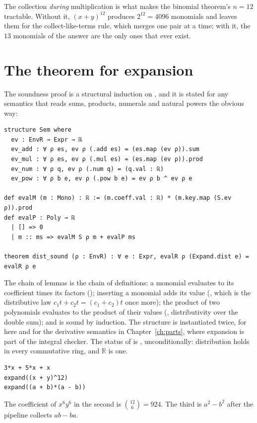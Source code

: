 The collection \emph{during} multiplication is what makes the binomial theorem's $n = 12$
tractable. Without it, $(x+y)^{12}$ produces $2^{12} = 4096$ monomials and leaves them for the
collect-like-terms rule, which merges one pair at a time; with it, the $13$ monomials of the
answer are the only ones that ever exist.

\section{The theorem for expansion}

The soundness proof is a structural induction on , and it is stated for any semantics
that reads sums, products, numerals and natural powers the obvious way:

\begin{verbatim}
structure Sem where
  ev : EnvR → Expr → ℝ
  ev_add : ∀ ρ es, ev ρ (.add es) = (es.map (ev ρ)).sum
  ev_mul : ∀ ρ es, ev ρ (.mul es) = (es.map (ev ρ)).prod
  ev_num : ∀ ρ q, ev ρ (.num q) = (q.val : ℝ)
  ev_pow : ∀ ρ b e, ev ρ (.pow b e) = ev ρ b ^ ev ρ e

def evalM (m : Mono) : ℝ := (m.coeff.val : ℝ) * (m.key.map (S.ev ρ)).prod
def evalP : Poly → ℝ
  | [] => 0
  | m :: ms => evalM S ρ m + evalP ms

theorem dist_sound (ρ : EnvR) : ∀ e : Expr, evalR ρ (Expand.dist e) = evalR ρ e
\end{verbatim}

The chain of lemmas is the chain of definitions: a monomial evaluates to its coefficient times
its factors (); inserting a monomial adds its value (,
which is the distributive law $c_1 t + c_2 t = (c_1 + c_2) t$ once more); the product of two
polynomials evaluates to the product of their values (, distributivity over
the double sum); and  is sound by induction. The structure  is instantiated
twice, for  here and for the derivative semantics  in
Chapter~\ref{ch:parts}, where expansion is part of the integral checker. The status of
 is , unconditionally: distribution holds in every commutative
ring, and $\mathbb{R}$ is one.

\begin{trybox}
\begin{verbatim}
3*x + 5*x + x
expand((x + y)^12)
expand((a + b)*(a - b))
\end{verbatim}
  The coefficient of $x^6 y^6$ in the second is $\binom{12}{6} = 924$. The third is
  $a^2 - b^2$ after the pipeline collects $ab - ba$.
\end{trybox}

